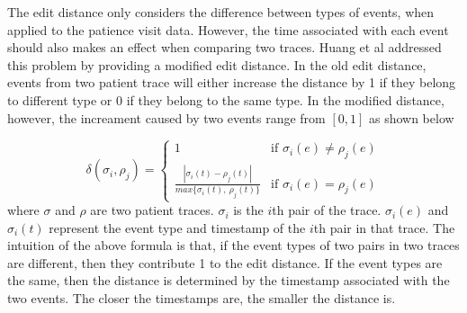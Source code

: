 The edit distance only considers the difference between types of events, when applied to the patience visit data. However, the time associated with each event should also makes an effect when comparing two traces. Huang et al addressed this problem by providing a modified edit distance. In the old edit distance, events from two patient trace will either increase the distance by 1 if they belong to different type or 0 if they belong to the same type. In the modified distance, however, the increament caused by two events range from $\left[ 0, 1\right] $ as shown below

\begin{equation*}
\delta(\sigma_i, \rho_j) = \begin{cases} 
   1 & \text{if } \sigma_i(e) \neq \rho_j(e) \\
   \frac{| \sigma_i(t) - \rho_j(t) | }{max\{\sigma_i(t),~ \rho_j(t)\}}       & \text{if } \sigma_i(e) = \rho_j(e)
  \end{cases}
\end{equation*}
where $\sigma$ and $\rho$ are two patient traces. $\sigma_i$ is the $i$th pair of the trace. $\sigma_i(e)$ and $\sigma_i(t)$ represent the event type and timestamp of the $i$th pair in that trace. The intuition of the above formula is that, if the event types of two pairs in two traces are different, then they contribute 1 to the edit distance. If the event types are the same, then the distance is determined by the timestamp associated with the two events. The closer the timestamps are, the smaller the distance is. 

